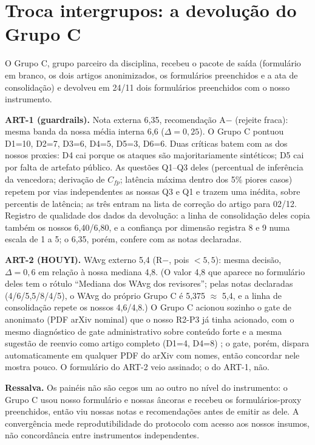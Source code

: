 \documentclass[10pt,a4paper,twocolumn]{article}
\begin{document}
\section{Troca intergrupos: a devolução do Grupo C}

O Grupo C, grupo parceiro da disciplina, recebeu o pacote de saída (formulário em branco, os dois artigos anonimizados, os formulários preenchidos e a ata de consolidação) e devolveu em 24/11 dois formulários preenchidos com o nosso instrumento.

\textbf{ART-1 (guardrails).} Nota externa 6,35, recomendação A$-$ (rejeite fraca): mesma banda da nossa média interna 6,6 ($\Delta = 0{,}25$). O Grupo C pontuou D1=10, D2=7, D3=6, D4=5, D5=3, D6=6. Duas críticas batem com as dos nossos proxies: D4 cai porque os ataques são majoritariamente sintéticos; D5 cai por falta de artefato público. As questões Q1--Q3 deles (percentual de inferência da vencedora; derivação de $C_{fp}$; latência máxima dentro dos 5\% piores casos) repetem por vias independentes as nossas Q3 e Q1 e trazem uma inédita, sobre percentis de latência; as três entram na lista de correção do artigo para 02/12. Registro de qualidade dos dados da devolução: a linha de consolidação deles copia também os nossos 6,40/6,80, e a confiança por dimensão registra 8 e 9 numa escala de 1 a 5; o 6,35, porém, confere com as notas declaradas.

\textbf{ART-2 (HOUYI).} WAvg externo 5,4 (R$-$, pois $<5{,}5$): mesma decisão, $\Delta = 0{,}6$ em relação à nossa mediana 4,8. (O valor 4,8 que aparece no formulário deles tem o rótulo ``Mediana dos WAvg dos revisores''; pelas notas declaradas (4/6/5,5/8/4/5), o WAvg do próprio Grupo C é 5,375 $\approx$ 5,4, e a linha de consolidação repete os nossos 4,6/4,8.) O Grupo C acionou sozinho o gate de anonimato (PDF arXiv nominal) que o nosso R2-P3 já tinha acionado, com o mesmo diagnóstico de gate administrativo sobre conteúdo forte e a mesma sugestão de reenvio como artigo completo (D1=4, D4=8) ; o gate, porém, dispara automaticamente em qualquer PDF do arXiv com nomes, então concordar nele mostra pouco. O formulário do ART-2 veio assinado; o do ART-1, não.

\textbf{Ressalva.} Os painéis não são cegos um ao outro no nível do instrumento: o Grupo C usou nosso formulário e nossas âncoras e recebeu os formulários-proxy preenchidos, então viu nossas notas e recomendações antes de emitir as dele. A convergência mede reprodutibilidade do protocolo com acesso aos nossos insumos, não concordância entre instrumentos independentes.
\end{document}

